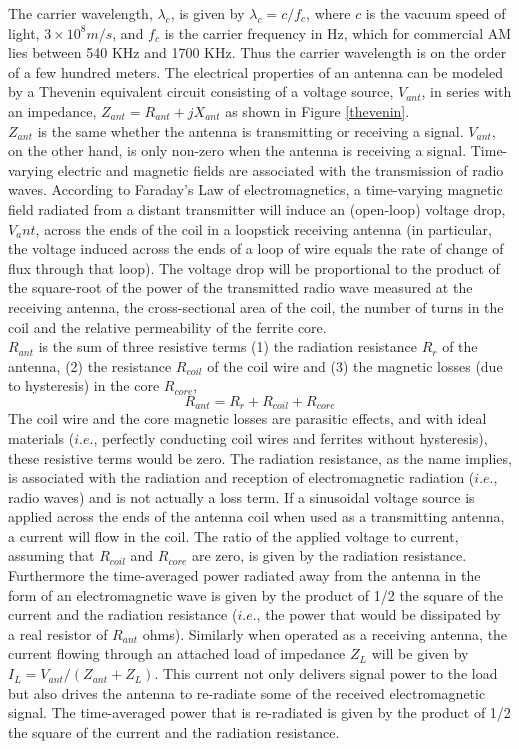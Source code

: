 \documentclass{article}
\begin{document}
The carrier wavelength, $\lambda_c$, is given by $\lambda_c = c/f_c$, where $c$ is the vacuum speed of light, $3\times10^8 m/s$, and $f_c$ is the carrier frequency in Hz, which for commercial AM lies between 540 KHz and 1700 KHz. Thus the carrier wavelength is on the order of a few hundred meters. The electrical properties of an antenna can be modeled by a Thevenin equivalent circuit consisting of a voltage source, $V_{ant}$, in series with an impedance, $Z_{ant} = R_{ant} + jX_{ant}$ as shown in Figure \ref{thevenin}.\\
$Z_{ant}$ is the same whether the antenna is transmitting or receiving a signal. $V_{ant}$, on the other hand, is only non-zero when the antenna is receiving a signal. Time-varying electric and magnetic fields are associated with the transmission of radio waves. According to Faraday’s Law of electromagnetics, a time-varying magnetic field radiated from a distant transmitter will induce an (open-loop) voltage drop, $V_ant$, across the ends of the coil in a loopstick receiving antenna (in particular, the voltage induced across the ends of a loop of wire equals the rate of change of flux through that loop). The voltage drop will be proportional to the product of the square-root of the power of the transmitted radio wave measured at the receiving antenna, the cross-sectional area of the coil, the number of turns in the coil and the relative permeability of the ferrite core.\\
$R_{ant}$ is the sum of three resistive terms (1) the radiation resistance $R_r$ of the antenna, (2) the resistance $R_{coil}$ of the coil wire and (3) the magnetic losses (due to hysteresis) in the core $R_{core}$,
$$R_{ant} = R_r + R_{coil} + R_{core}$$
The coil wire and the core magnetic losses are parasitic effects, and with ideal materials ($i.e.$, perfectly conducting coil wires and ferrites without hysteresis), these resistive terms would be zero. The radiation resistance, as the name implies, is associated with the radiation and reception of electromagnetic radiation ($i.e.$, radio waves) and is not actually a loss term. If a sinusoidal voltage source is applied across the ends of the antenna coil when used as a transmitting antenna, a current will flow in the coil. The ratio of the applied voltage to current, assuming that $R_{coil}$ and $R_{core}$ are zero, is given by the radiation resistance. Furthermore the time-averaged power radiated away from the antenna in the form of an electromagnetic wave is given by the product of 1/2 the square of the current and the radiation resistance ($i.e.$, the power that would be dissipated by a real resistor of $R_{ant}$ ohms). Similarly when operated as a receiving antenna, the current flowing through an attached load of impedance $Z_L$ will be given by $I_L = V_{ant}/(Z_{ant} +Z_L )$. This current not only delivers signal power to the load but also drives the antenna to re-radiate some of the received electromagnetic signal. The time-averaged power that is re-radiated is given by the product of 1/2 the square of the current and the radiation resistance.\\
\end{document}
